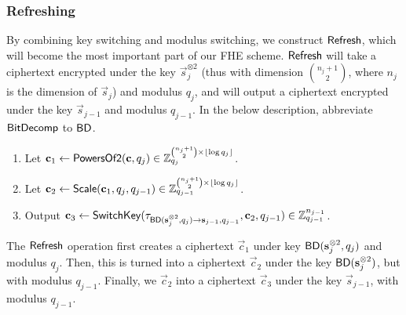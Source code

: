     \subsubsection{Refreshing}

    By combining key switching and modulus switching, we construct ${\sf Refresh}$, which will become the most important part of our FHE scheme. ${\sf Refresh}$ will take a ciphertext encrypted under the key $\vec{s}_j^{\otimes 2}$ (thus with dimension ${n_j + 1}\choose{2}$, where $n_j$ is the dimension of $\vec{s}_j$) and modulus $q_j$, and will output a ciphertext encrypted under the key $\vec{s}_{j-1}$ and modulus $q_{j-1}$. In the below description, abbreviate ${\sf BitDecomp}$ to ${\sf BD}$.

    \begin{description}[leftmargin=*]
        \item[${\sf Refresh}(\vec{c} \in \Z_{q_j}^{{n_j+1}\choose{2}}, \tau_{{\sf BD}(\vec{s}_j^{\otimes 2}, q_j) \to \vec{s}_{j-1}, q_{j-1}}, q_j, q_{j-1})$:]
        \item[]
        \begin{enumerate}
            \item Let $\vec{c}_1 \leftarrow {\sf PowersOf2}(\vec{c}, q_j) \in \Z_{q_j}^{{{n_j+1}\choose{2}} \times \lfloor \log q_j \rfloor}$.
            \item Let $\vec{c}_2 \leftarrow {\sf Scale}(\vec{c}_1, q_j, q_{j-1}) \in \Z_{q_{j-1}}^{{{n_j+1}\choose{2}} \times \lfloor \log q_j \rfloor}$.
            \item Output $\vec{c}_3 \leftarrow {\sf SwitchKey}(\tau_{{\sf BD}(\vec{s}_j^{\otimes 2}, q_j) \to \vec{s}_{j-1}, q_{j-1}}, \vec{c}_2, q_{j-1}) \in \Z_{q_{j-1}}^{n_{j-1}}$.
        \end{enumerate}
    \end{description}

    The ${\sf Refresh}$ operation first creates a ciphertext $\vec{c}_1$ under key ${\sf BD}(\vec{s}_j^{\otimes 2}, q_j)$ and modulus $q_j$. Then, this is turned into a ciphertext $\vec{c}_2$ under the key ${\sf BD}(\vec{s}_j^{\otimes 2})$, but with modulus $q_{j-1}$. Finally, we $\vec{c}_2$ into a ciphertext $\vec{c}_3$ under the key $\vec{s}_{j-1}$, with modulus $q_{j-1}$.

